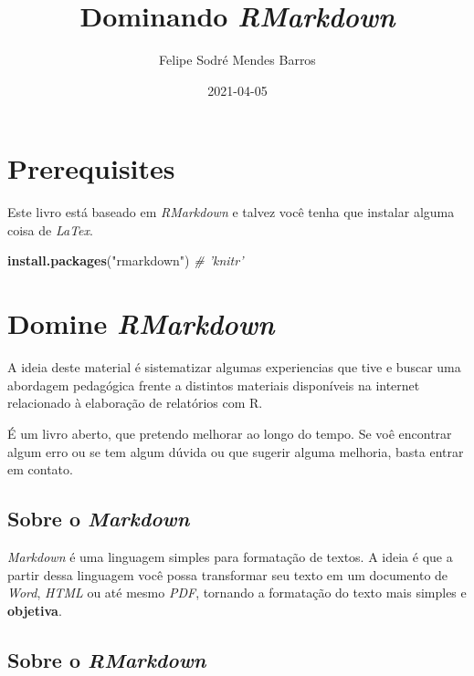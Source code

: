 \documentclass[]{book}
\title{Dominando \emph{RMarkdown}}
\author{Felipe Sodré Mendes Barros}
\date{2021-04-05}
\newenvironment{Shaded}{\begin{snugshade}}{\end{snugshade}}
\newcommand{\CommentTok}[1]{\textcolor[rgb]{0.56,0.35,0.01}{\textit{#1}}}
\newcommand{\KeywordTok}[1]{\textcolor[rgb]{0.13,0.29,0.53}{\textbf{#1}}}
\newcommand{\NormalTok}[1]{#1}
\newcommand{\StringTok}[1]{\textcolor[rgb]{0.31,0.60,0.02}{#1}}
\begin{document}
\maketitle

{
\setcounter{tocdepth}{1}
\tableofcontents
}
\hypertarget{prerequisites}{%
\chapter{Prerequisites}\label{prerequisites}}

Este livro está baseado em \emph{RMarkdown} e talvez você tenha que instalar alguma coisa de \emph{LaTex}.

\begin{Shaded}
\begin{Highlighting}[]
\KeywordTok{install.packages}\NormalTok{(}\StringTok{"rmarkdown"}\NormalTok{)}
\CommentTok{# 'knitr'}
\end{Highlighting}
\end{Shaded}

\hypertarget{intro}{%
\chapter{\texorpdfstring{Domine \emph{RMarkdown}}{Domine RMarkdown}}\label{intro}}

A ideia deste material é sistematizar algumas experiencias que tive e buscar uma abordagem pedagógica frente a distintos materiais disponíveis na internet relacionado à elaboração de relatórios com R.

É um livro aberto, que pretendo melhorar ao longo do tempo. Se voê encontrar algum erro ou se tem algum dúvida ou que sugerir alguma melhoria, basta entrar em contato.

\hypertarget{markdown}{%
\section{\texorpdfstring{Sobre o \emph{Markdown}}{Sobre o Markdown}}\label{markdown}}

\emph{Markdown} é uma linguagem simples para formatação de textos. A ideia é que a partir dessa linguagem você possa transformar seu texto em um documento de \emph{Word}, \emph{HTML} ou até mesmo \emph{PDF}, tornando a formatação do texto mais simples e \textbf{objetiva}.

\hypertarget{rmarkdown}{%
\section{\texorpdfstring{Sobre o \emph{RMarkdown}}{Sobre o RMarkdown}}\label{rmarkdown}}
\end{document}
